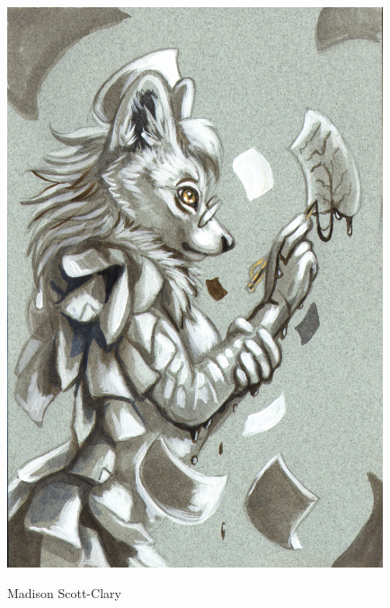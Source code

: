 \begin{paracol}{2}
\begin{leftcolumn}
\includegraphics[width=4.35in]{assets/cadmiumtea--MurderYourDarlings--makyo--G.jpg}
\end{leftcolumn}
\begin{rightcolumn}
Madison Scott-Clary
\end{rightcolumn}
\end{paracol}
